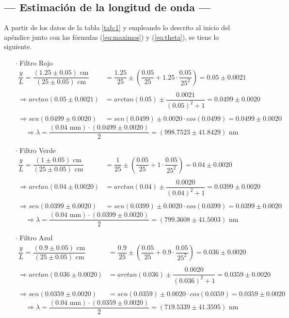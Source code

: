 \documentclass[12pt,a4paper]{article}
\begin{document}
\subsection{--- Estimación de la longitud de onda ---}
A partir de los datos de la tabla \ref{tab:1} y empleando lo descrito al inicio del apéndice junto con las fórmulas (\ref{eq:maximos}) y (\ref{eq:theta}), se tiene lo siguiente.
\begin{itemize}
\item [$\cdot$] Filtro Rojo
\begin{align*}
\dfrac{y}{L}=\dfrac{(1.25\pm 0.05)\mbox{ cm}}{(25\pm 0.05)\mbox{ cm}}&=
\dfrac{1.25}{25}\pm\left(\dfrac{0.05}{25}+1.25\cdot\dfrac{0.05}{25^2}\right)=
0.05 \pm 0.0021\\\\
\Longrightarrow arctan(	0.05 \pm 0.0021)&=
arctan(0.05)\pm\dfrac{0.0021}{(0.05)^2+1}=0.0499\pm 0.0020\\\\
\Longrightarrow sen(0.0499\pm 0.0020)&=sen(0.0499)\pm 0.0020\cdot cos(0.0499)=0.0499\pm0.0020
\end{align*}
$$\Longrightarrow \lambda=\dfrac{(0.04\mbox{ mm})\cdot(0.0499\pm0.0020)}{2}=
(998.7523\pm 41.8429)\mbox{ nm}$$
\item [$\cdot$] Filtro Verde
\begin{align*}
\dfrac{y}{L}=\dfrac{(1\pm 0.05)\mbox{ cm}}{(25\pm 0.05)\mbox{ cm}}&=
\dfrac{1}{25}\pm\left(\dfrac{0.05}{25}+1\cdot\dfrac{0.05}{25^2}\right)=
0.04 \pm 0.0020\\\\
\Longrightarrow arctan(	0.04 \pm 0.0020)&=
arctan(0.04)\pm\dfrac{0.0020}{(0.04)^2+1}=
0.0399\pm 0.0020\\\\
\Longrightarrow sen(0.0399\pm 0.0020)&=sen(0.0399)\pm 0.0020\cdot cos(0.0399)=0.0399\pm 0.0020
\end{align*}
$$\Longrightarrow \lambda=\dfrac{(0.04\mbox{ mm})\cdot(0.0399\pm 0.0020)}{2}=
(799.3608\pm 41.5003)\mbox{ nm}$$
\item [$\cdot$] Filtro Azul
\begin{align*}
\dfrac{y}{L}=\dfrac{(0.9\pm 0.05)\mbox{ cm}}{(25\pm 0.05)\mbox{ cm}}&=
\dfrac{0.9}{25}\pm\left(\dfrac{0.05}{25}+0.9\cdot\dfrac{0.05}{25^2}\right)=
0.036 \pm 0.0020\\\\
\Longrightarrow arctan(0.036 \pm 0.0020)&=
arctan(0.036)\pm\dfrac{0.0020}{(0.036)^2+1}=
0.0359\pm 0.0020\\\\
\Longrightarrow sen(0.0359\pm 0.0020)&=sen(0.0359)\pm 0.0020\cdot cos(0.0359)=0.0359\pm 0.0020
\end{align*}
$$\Longrightarrow \lambda=\dfrac{(0.04\mbox{ mm})\cdot(0.0359\pm 0.0020)}{2}=
(719.5339\pm 41.3595)\mbox{ nm}$$
\end{itemize}
\end{document}
